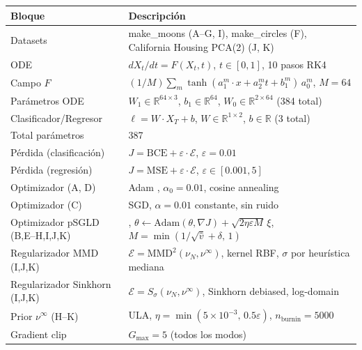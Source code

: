 \documentclass[11pt, a4paper]{article}
\theoremstyle{definition}
\newcommand{\R}{\mathbb{R}}
\begin{document}
\begin{center}
\begin{tabular}{p{4.8cm}p{10.5cm}}
\toprule
Bloque & Descripción \\
\midrule
Datasets & make\_moons (A–G, I), make\_circles (F), California Housing PCA(2) (J, K) \\
ODE & $dX_t/dt = F(X_t,t)$, $t \in [0,1]$, 10 pasos RK4 \\
Campo $F$ & $(1/M)\sum_m \tanh(a_1^m \cdot x + a_2^m t + b_1^m)\,a_0^m$,\; $M=64$ \\
Parámetros ODE & $W_1 \in \R^{64\times3}$, $b_1\in\R^{64}$, $W_0\in\R^{2\times64}$ (384 total)\\
Clasificador/Regresor & $\ell = W \cdot X_T + b$,\; $W \in \R^{1\times 2}$,\; $b \in \R$ (3 total) \\
Total parámetros & 387 \\
Pérdida (clasificación) & $J = \text{BCE} + \varepsilon \cdot \mathcal{E}$,\; $\varepsilon = 0.01$ \\
Pérdida (regresión) & $J = \text{MSE} + \varepsilon \cdot \mathcal{E}$,\; $\varepsilon \in [0.001, 5]$ \\
Optimizador (A, D) & Adam \cite{kingma2015adam},\; $\alpha_0=0.01$,\; cosine annealing \\
Optimizador (C) & SGD,\; $\alpha=0.01$ constante,\; sin ruido \\
Optimizador pSGLD (B,E–H,I,J,K) & \cite{li2016psgld},\; $\theta \leftarrow \text{Adam}(\theta,\nabla J) + \sqrt{2\eta\varepsilon M}\,\xi$,\; $M = \min(1/\sqrt{\hat{v}}+\delta,\,1)$ \\
Regularizador MMD (I,J,K) & $\mathcal{E} = \mathrm{MMD}^2(\nu_N, \nu^\infty)$,\; kernel RBF,\; $\sigma$ por heurística mediana \cite{gretton2012kernel} \\
Regularizador Sinkhorn (I,J,K) & $\mathcal{E} = S_\sigma(\nu_N, \nu^\infty)$,\; Sinkhorn debiased,\; log-domain \cite{feydy2019interpolating} \\
Prior $\nu^\infty$ (H–K) & ULA,\; $\eta = \min(5\times10^{-3},\, 0.5\varepsilon)$,\; $n_\text{burnin}=5000$ \\
Gradient clip & $G_{\max}=5$ (todos los modos) \\
\bottomrule
\end{tabular}
\end{center}
\end{document}
